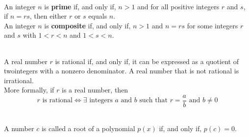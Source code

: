 \documentclass[12pt]{article}
\begin{document}
\begin{definition}
\hfill\\
\normalfont An integer $n$ is \textbf{prime} if, and only if, $n > 1$ and for all positive integers $r$ and $s$, if $n = rs$, then either $r$ or $s$ equals $n$. \\
An integer $n$ is \textbf{composite} if, and only if, $n > 1$ and $n = rs$ for some integers $r$ and $s$ with $1 < r < n$ and $1 < s < n$. 
\end{definition}
\begin{definition}
\hfill\\
\normalfont A real number $r$ is rational if, and only if, it can be expressed as a quotient of twointegers with a nonzero denominator. A real number that is not rational is irrational.\\
More formally, if $r$ is a real number, then
\[
r \text{ is rational}\Leftrightarrow\exists \text{ integers }a\text{ and }b \text{ such that }r=\frac{a}{b}\text{ and } b\neq 0
\]
\end{definition}


\begin{definition}
\hfill\\
\normalfont A number $c$ is called a root of a polynomial $p(x)$ if, and only if, $p(c) = 0$.

\end{definition}
\end{document}
